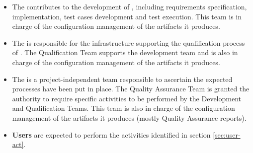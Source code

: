 \begin{itemize}
\item%
  The  contributes to the development of \xcov{},
  including requirements specification, implementation, test cases development
  and test execution.
  This team is in charge of the configuration management of the artifacts it
  produces.
\item%
  The  is responsible for the infrastructure
  supporting the qualification process of \xcov{}.
  The Qualification Team supports the development team and is also in charge
  of the configuration management of the artifacts it produces.
\item%
  The  is a project-independent team
  responsible to ascertain the expected processes have been put in place.
  The Quality Assurance Team is granted the authority to require specific
  activities to be performed by the \xcov{} Development and Qualification
  Teams.
  This team is also in charge of the configuration management of the
  artifacts it produces (mostly Quality Assurance reports).
\item \textbf{\xcov{} Users} are expected to perform the activities identified
  in section \ref{sec:user-act}.
\end{itemize}
